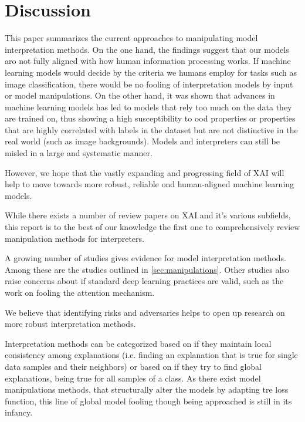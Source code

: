 \section{Discussion}
\label{sec:discussion}

This paper summarizes the current approaches to manipulating model interpretation methods. 
On the one hand, the findings suggest that our models aro not fully aligned with how human information processing works. If machine learning models would decide by the criteria we humans employ for tasks such as image classification, there would be no fooling of interpretation models by input or model manipulations. 
On the other hand, it was shown that advances in machine learning models has led to models that rely too much on the data they are trained on, thus showing a high susceptibility to ood properties or properties that are highly correlated with labels in the dataset but are not distinctive in the real world (such as image backgrounds). Models and interpreters can still be misled in a large and systematic manner. 

However, we hope that the vastly expanding and progressing field of XAI will help to move towards more robust, reliable ond human-aligned machine learning models. 

While there exists a number of review papers on XAI and it's various subfields, this report is to the best of our knowledge the first one to comprehensively review manipulation methods for interpreters. 

A growing number of studies gives evidence for model interpretation methods. Among these are the studies outlined in \autoref{sec:manipulations}. Other studies also raise concerns about if standard deep learning practices are valid, such as the work on fooling the attention mechanism. %

We believe that identifying risks and adversaries helps to open up research on more robust interpretation methods. 

Interpretation methods can be categorized based on if they maintain local consistency among explanations (i.e. finding an explanation that is true for single data samples and their neighbors) or based on if they try to find global explanations, being true for all samples of a class. 
As there exist model manipulations methods, that structurally alter the models by adapting tre loss function, this line of global model fooling though being approached is still in its infancy. 



